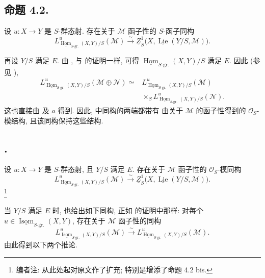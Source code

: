 \subsection*{命题 4.2.}
设 \(u:X\to Y\) 是 \(S\)-群态射. 存在关于 \(\mathcal M\) 函子性的
\(S\)-函子同构
\[
 L^u_{\underline{\operatorname{Hom}}_{S\text{-gr.}}(X,Y)/S}
   (\mathcal M)
 \xrightarrow{\sim}
 \underline Z^1_S
   \bigl(X,\underline{\operatorname{Lie}}(Y/S,\mathcal M)\bigr).
\]

再设 \(Y/S\) 满足 \(E\). 由 ,
与  的证明一样, 可得
\(\underline{\operatorname{Hom}}_{S\text{-gr.}}(X,Y)/S\) 满足 \(E\).
因此 (参见 ),
\[
\begin{aligned}
 L^u_{\underline{\operatorname{Hom}}_{S\text{-gr.}}(X,Y)/S}
 (\mathcal M\oplus\mathcal N)
 \simeq{}&
 L^u_{\underline{\operatorname{Hom}}_{S\text{-gr.}}(X,Y)/S}
 (\mathcal M)\\
 &\times_S
 L^u_{\underline{\operatorname{Hom}}_{S\text{-gr.}}(X,Y)/S}
 (\mathcal N).
\end{aligned}
\]
这也直接由 及
\(a\) 得到.
因此,  中同构的两端都带有
由关于 \(\mathcal M\) 的函子性得到的 \(\mathcal O_S\)-模结构,
且该同构保持这些结构.

\subsection*{.}
设 \(u:X\to Y\) 是 \(S\)-群态射, 且 \(Y/S\) 满足 \(E\).
存在关于 \(\mathcal M\) 函子性的 \(\mathcal O_S\)-模同构
\[
 L^u_{\underline{\operatorname{Hom}}_{S\text{-gr.}}(X,Y)/S}
   (\mathcal M)
 \xrightarrow{\sim}
 \underline Z^1_S
   \bigl(X,\underline{\operatorname{Lie}}(Y/S,\mathcal M)\bigr).
\]
\footnote{编者注: 从此处起对原文作了扩充; 特别是增添了命题 4.2 bis.}

当 \(Y/S\) 满足 \(E\) 时, 
也给出如下同构, 正如  的证明中那样:
对每个 \(u\in\underline{\operatorname{Isom}}_{S\text{-gr.}}(X,Y)\),
存在关于 \(\mathcal M\) 函子性的同构
\begin{equation}
 L^u_{\underline{\operatorname{Isom}}_{S\text{-gr.}}(X,Y)/S}
   (\mathcal M)
 \xrightarrow{\sim}
 L^u_{\underline{\operatorname{Hom}}_{S\text{-gr.}}(X,Y)/S}
   (\mathcal M).
 \tag{*}\label{sga3:ii:subsection:4-2:equation:star}
\end{equation}
由此得到以下两个推论.

